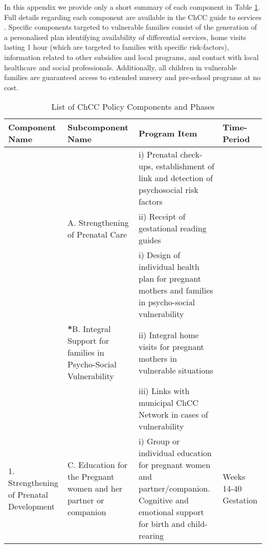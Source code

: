 \documentclass[12pt]{article}
\begin{document}
\begin{spacing}{1.4}
In this appendix we provide only a short summary of each
component in Table \ref{ascn:benefits}. Full details regarding
each component are available in the ChCC
guide to services \citep{MDS2014}.  Specific components
targeted to vulnerable families consist of the generation of
a personalised plan identifying availability of differential
services, home visits lasting 1 hour (which are 
targeted to families with specific risk-factors), information
related to other subsidies and local programs, and 
contact with local healthcare and social professionals.  Additionally,
all children in vulnerable families are guaranteed access to
extended nursery and pre-school programs at no cost.


\begin{landscape}
\begin{table}[htpb!]
  \caption{List of ChCC Policy Components and Phases}
  \label{ascn:benefits}
  \begin{tabular}{p{4.5cm}p{5cm}p{10cm}p{2.5cm}}
    \toprule
    Component Name & Subcomponent Name & Program Item & Time-Period\\ \midrule
\cellcolor{dccol}&  \cellcolor{dccol} &\cellcolor{dccol}i) Prenatal check-ups, establishment of link and detection of psychosocial risk factors  &  \cellcolor{dccol} \\
\cellcolor{dccol} & \multirow{-3}{5cm}{\cellcolor{dccol}A. Strengthening of Prenatal Care}        &ii) Receipt of gestational reading guides & \cellcolor{dccol}\\
\cellcolor{dccol} &&\cellcolor{dccol}i) Design of individual health plan for pregnant mothers and families in psycho-social vulnerability&\cellcolor{dccol}\\
\cellcolor{dccol} &\multirow{-2}{5cm}{\textbf{*}B. Integral Support for families in Psycho-Social Vulnerability} &ii) Integral home visits for pregnant mothers in vulnerable situations &\cellcolor{dccol} \\
\cellcolor{dccol} & &\cellcolor{dccol}iii) Links with municipal ChCC Network in cases of vulnerability &\cellcolor{dccol}\\
\multirow{-6}{4.5cm}{\cellcolor{dccol}1. Strengthening of Prenatal Development}                                                        &\cellcolor{dccol} C. Education for the Pregnant women and her partner or companion&i) Group or individual education for pregnant women and partner/companion.  Cognitive and emotional support for birth and child-rearing&\multirow{-6}{2.5cm}{\cellcolor{dccol}Weeks 14-40 Gestation}\\ \midrule %

\end{tabular}
\end{table}
\end{landscape}
\end{spacing}
\end{document}
